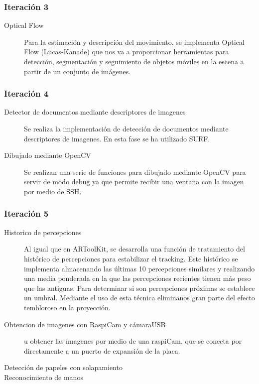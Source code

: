 \begin{description}
\begin{description}
\end{description}

\subsubsection{Iteración 3}
\begin{description}
\item [Optical Flow] Para la estimación y descripción del movimiento, se implementa Optical Flow  (Lucas-Kanade) que nos va a proporcionar herramientas para detección, segmentación y seguimiento de  objetos móviles en la escena a partir de un conjunto de imágenes. 

\end{description}
\subsubsection{Iteración 4}
\begin{description}
\item [Detector de documentos mediante descriptores de imagenes] Se realiza la implementación de detección de documentos mediante descriptores de imagenes. En esta fase se ha utilizado SURF.
\item [Dibujado mediante OpenCV] Se realizan una serie de funciones para dibujado mediante OpenCV para servir de modo debug ya que permite recibir una ventana con la imagen por medio de SSH.
\end{description}

\subsubsection{Iteración 5}
\begin{description}
\item [Historico de percepciones] Al igual que en ARToolKit, se desarrolla una función de tratamiento del histórico de percepciones para estabilizar el tracking. Este histórico se implementa  almacenando las últimas 10 percepciones similares y realizando una media ponderada en la que las percepciones recientes tienen más peso que las antiguas. Para determinar si son percepciones próximas se establece un umbral. Mediante el uso de esta técnica eliminanos gran parte del efecto tembloroso en la proyección.
\item [Obtencion de imagenes con RaspiCam y cámaraUSB]
 u obtener las ímagenes por medio de una raspiCam, que se conecta por directamente a un puerto de expansión de la placa.
\item [Detección de papeles con solapamiento] 
\item [Reconocimiento de manos] 



\end{description}
\end{description}
